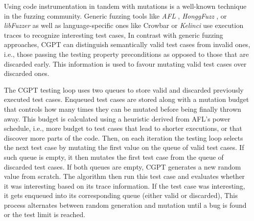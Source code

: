 \documentclass[sigconf,review,anonymous]{acmart}
\begin{document}
Using code instrumentation in tandem with mutations is a well-known technique in
the fuzzing community.
%
Generic fuzzing tools like \emph{AFL} \cite{afl}, \emph{HonggFuzz}
\cite{honggfuzz}, or \emph{libFuzzer} \citeyear{libfuzzer} as well as
language-specific ones like Crowbar \cite{dolan2017testing} or \emph{Kelinci}
\cite{kersten2017poster} use execution traces to recognize interesting test
cases, 
%
%
%
%
In contrast with generic fuzzing approaches, CGPT can distinguish semantically
valid test cases from invalid ones, i.e., those passing the testing property
preconditions as opposed to those that are discarded early.
%
This information is used to favour mutating valid test cases over discarded
ones.


The CGPT testing loop uses two queues to store valid and discarded previously
executed test cases.
%
Enqueued test cases are stored along with a mutation budget that controls how
many times they can be mutated before being finally thrown away.
%
This budget is calculated using a heuristic derived from AFL's power schedule,
i.e., more budget to test cases that lead to shorter executions, or that
discover more parts of the code.
%
Then, on each iteration the testing loop selects the next test case by mutating
the first value on the queue of valid test cases.
%
If such queue is empty, it then mutates the first test case from the queue of
discarded test cases.
%
If both queues are empty, CGPT generates a new random value from scratch.
%
The algorithm then run this test case and evaluates whether it was interesting
based on its trace information.
%
If the test case was interesting, it gets enqueued into its corresponding queue
(either valid or discarded),
%
%
This process alternates between random generation and mutation until a bug is
found or the test limit is reached.
\end{document}
